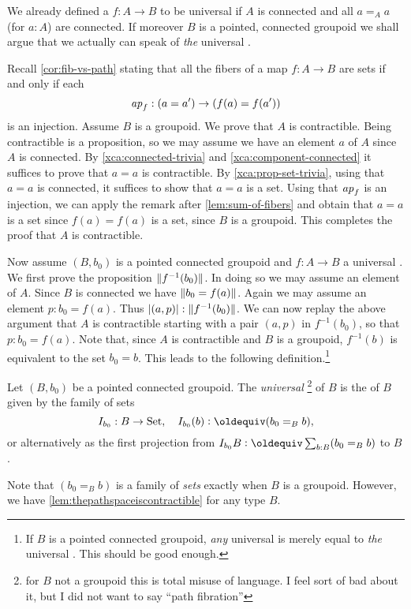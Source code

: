 We already defined a \covering $f:A\to B$ to be universal if $A$ is connected
and all $a=_A a$ (for $a:A$) are connected. 
If moreover $B$ is a pointed, connected groupoid we shall argue that
we actually can speak of \emph{the} universal \covering.

Recall \cref{cor:fib-vs-path} stating that all the fibers of a map $f:A\to B$ 
are sets if and only if each 
\[
\mathop{{\it ap}_{f}}: (a=a')\to (f(a)=f(a'))
\]
is an injection. Assume $B$ is a groupoid.
We prove that $A$ is contractible. 
Being contractible is a proposition, so we may assume 
we have an element $a$ of $A$ since $A$ is connected. 
By \cref{xca:connected-trivia} and \ref{xca:component-connected} 
it suffices to prove that $a=a$ is contractible.
By \cref{xca:prop-set-trivia}, using that $a=a$ is connected,
it suffices to show that $a=a$ is a set.
Using that $\mathop{{\it ap}_{f}}$ is an injection, we can apply the remark after
\cref{lem:sum-of-fibers} and obtain that $a=a$ is a set since
$f(a)=f(a)$ is a set, since $B$ is a groupoid.
This completes the proof that $A$ is contractible.

Now assume $(B,b_0)$ is a pointed connected groupoid and $f:A\to B$
a universal \covering. We first prove the proposition $\lVert f^{-1}(b_0)\rVert$.
In doing so we may assume an element of $A$. Since $B$ is connected
we have $\lVert b_0 = f(a)\rVert$. Again we may assume an element $p: b_0=f(a)$.
Thus $\lvert(a,p)\rvert:\lVert f^{-1}(b_0)\rVert$. 
We can now replay the above argument that $A$ is contractible starting
with a pair $(a,p)$ in $f^{-1}(b_0)$, so that $p: b_0 = f(a)$.
Note that, since $A$ is contractible and $B$ is a groupoid,
$f^{-1}(b)$ is equivalent to the set $b_0 = b$.
This leads to the following definition.\footnote{%
If $B$ is a pointed connected groupoid,
\emph{any} universal \covering is merely equal to \emph{the} universal \covering.
This should be good enough.}

\begin{definition}
  \label{def:universalcover}
  Let $(B,b_0)$ be a pointed connected groupoid.  
The \emph{universal \covering}\footnote{for $B$ not a groupoid this is total misuse of language.  I feel sort of bad about it, but I did not want to say ``path fibration''} of $B$ is the \covering of $B$ given by the family of sets 
  $$\uc{b_0}:B\to\Set,\quad \uc{b_0}(b)\defequi (b_0=_Bb),$$
or alternatively as the first projection from $\uc{b_0}B\defequi\sum_{b:B}(b_0=_Bb)$ to $B$. 
\end{definition}
Note that $(b_0=_B b)$ is a family of \emph{sets} exactly when $B$ is a groupoid. 
However, we have \cref{lem:thepathspaceiscontractible} for any type $B$.

